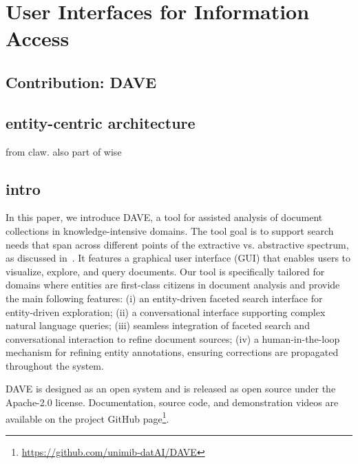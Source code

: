 \section{User Interfaces for Information Access}
\label{sec:iaui}
\subsection{Contribution: DAVE}

\subsection{entity-centric architecture}
from claw. also part of wise


\subsection{intro}

In this paper, we introduce DAVE, a tool for assisted analysis of document collections in knowledge-intensive domains. 
The tool goal is to support search needs that span across different points of the extractive vs. abstractive spectrum, as discussed in~\cite{worledge2024extractive}.     
It features a graphical user interface (GUI) that enables users to visualize, explore, and query documents.
Our tool is specifically tailored  for domains where entities are first-class citizens in document analysis and provide the main following features:
(i) an entity-driven faceted search interface for entity-driven exploration; 
(ii) a conversational interface supporting complex natural language queries; 
(iii) seamless integration of faceted search and conversational interaction to refine document sources;
(iv) a human-in-the-loop mechanism for refining entity annotations, ensuring corrections are propagated throughout the system.

DAVE is designed as an open system and is released as open source under the Apache-2.0 license. Documentation, source code, and demonstration videos are available on the project GitHub page\footnote{\url{https://github.com/unimib-datAI/DAVE}}.

